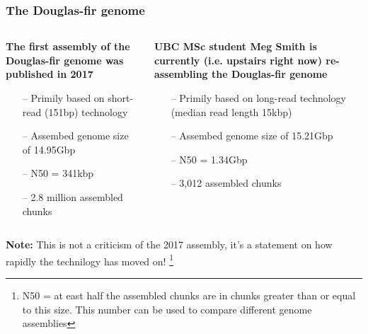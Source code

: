 \documentclass{beamer}
\newcommand\blfootnote[1]{%
	\begingroup
	\renewcommand\thefootnote{}\footnote{#1}%
	\addtocounter{footnote}{-1}%
	\endgroup
}
\begin{document}
	
	\begin{frame}
		
		\frametitle{The Douglas-fir genome}
		\small
		\begin{columns}
			\begin{column}{0.5\textwidth}
\textbf{					The first assembly of the Douglas-fir genome was published in 2017\\}
					\begin{itemize}

					\item[--] Primily based on short-read (151bp) technology
					\item[--] Assembed genome size of 14.95Gbp
					\item[--] N50 = 341kbp
					\item[--] 2.8 million assembled chunks
					
			\end{itemize}
			\end{column}
			\begin{column}{0.5\textwidth}
				\pause
				
\textbf{				UBC MSc student Meg Smith is currently (i.e. upstairs right now) re-assembling the Douglas-fir genome}
				
				\begin{itemize}
					\item[--] Primily based on long-read technology (median read length 15kbp) 
					\item[--] Assembed genome size of 15.21Gbp
					\item[--] N50 = 1.34Gbp
					\item[--] 3,012 assembled chunks
					
				\end{itemize}
			\end{column}
		\end{columns}
		
		\vspace{10pt}
\scriptsize	\textbf{Note:} This is not a criticism of the 2017 assembly, it's a statement on how rapidly the technilogy has moved on!
\blfootnote{N50 = at east half the assembled chunks are in chunks greater than or equal to this size. This number can be used to compare different genome assemblies}
	\end{frame}

	
\end{document}

